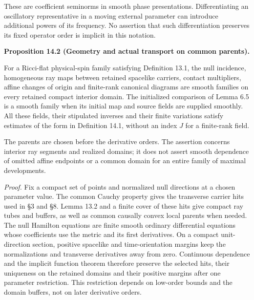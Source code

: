 \documentclass[
  english,
  11pt,
  reqno]{amsart}
\makeatletter
\newcommand{\pandocstatementheading}[1]{%
  \par\addpenalty{\@beginparpenalty}%
  \addvspace{.5\baselineskip plus .2\baselineskip minus .2\baselineskip}%
  {\normalfont\bfseries #1\par}%
  \nobreak\@afterindenttrue\@afterheading
}
\makeatother
\begin{document}
These are coefficient seminorms in smooth phase presentations.
Differentiating an oscillatory representative in a moving external
parameter can introduce additional powers of its frequency. No assertion
that such differentiation preserves its fixed operator order is implicit
in this notation.

\pandocstatementheading{\protect{}\label{prop:family-geometric-ray-comparisons}Proposition 14.2 (Geometry and actual transport on common parents).}

For a Ricci-flat physical-spin family satisfying Definition 13.1, the
null incidence, homogeneous ray maps between retained spacelike
carriers, contact multipliers, affine changes of origin and finite-rank
canonical diagrams are smooth families on every retained compact
interior domain. The initialized comparison of Lemma 6.5 is a smooth
family when its initial map and source fields are supplied smoothly. All
these fields, their stipulated inverses and their finite variations
satisfy estimates of the form in Definition 14.1, without an index \(J\)
for a finite-rank field.

The parents are chosen before the derivative orders. The assertion
concerns interior ray segments and realized domains; it does not assert
smooth dependence of omitted affine endpoints or a common domain for an
entire family of maximal developments.

\emph{Proof.} Fix a compact set of points and normalized null directions
at a chosen parameter value. The common Cauchy property gives the
transverse carrier hits used in §3 and §8. Lemma 13.2 and a finite cover
of these hits give compact ray tubes and buffers, as well as common
causally convex local parents when needed. The null Hamilton equations
are finite smooth ordinary differential equations whose coefficients use
the metric and its first derivatives. On a compact unit-direction
section, positive spacelike and time-orientation margins keep the
normalizations and transverse derivatives away from zero. Continuous
dependence and the implicit function theorem therefore preserve the
selected hits, their uniqueness on the retained domains and their
positive margins after one parameter restriction. This restriction
depends on low-order bounds and the domain buffers, not on later
derivative orders.
\end{document}
